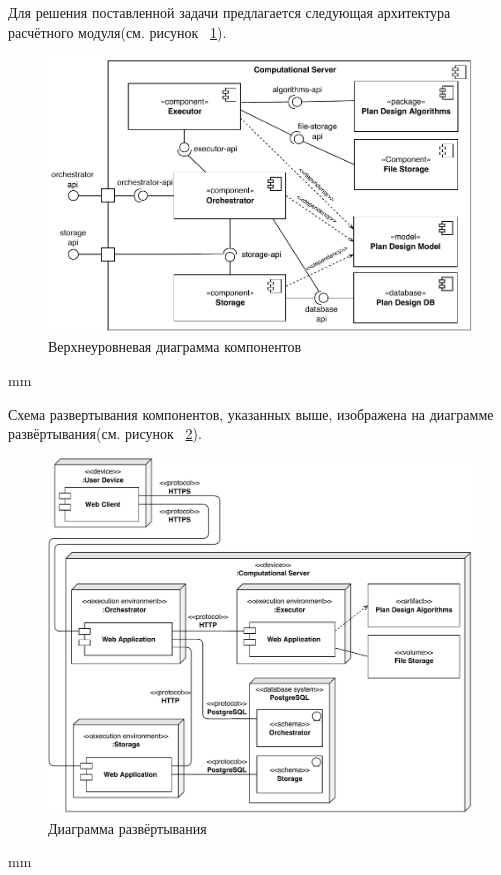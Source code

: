 Для решения поставленной задачи предлагается следующая архитектура расчётного
модуля(см. рисунок \ \ref{pic:architecture__common-component}).

\begin{figure}[H]
	\includegraphics[width=\textwidth, left]{architecture/pictures/common/component}
	\caption{Верхнеуровневая диаграмма компонентов}
	\label{pic:architecture__common-component}
\end{figure}
 mm

Схема развертывания компонентов, указанных выше, изображена на диаграмме
развёртывания(см. рисунок \ \ref{pic:architecture__common-deployment}).
\begin{figure}[H]
	\includegraphics[width=\textwidth, left]{architecture/pictures/common/deployment}
	\caption{Диаграмма развёртывания}
	\label{pic:architecture__common-deployment}
\end{figure}
 mm

